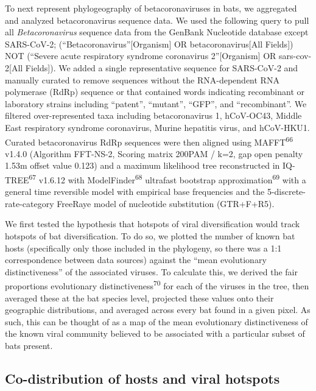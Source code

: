 \documentclass[11pt]{article}
\begin{document}
To next represent phylogeography of betacoronaviruses in bats, we
aggregated and analyzed betacoronavirus sequence data. We used the
following query to pull all \emph{Betacoronavirus} sequence data from
the GenBank Nucleotide database except SARS-CoV-2;
(``Betacoronavirus''{[}Organism{]} OR betacoronavirus{[}All Fields{]})
NOT (``Severe acute respiratory syndrome coronavirus 2''{[}Organism{]}
OR sars-cov-2{[}All Fields{]}). We added a single representative
sequence for SARS-CoV-2 and manually curated to remove sequences without
the RNA-dependent RNA polymerase (RdRp) sequence or that contained words
indicating recombinant or laboratory strains including ``patent'',
``mutant'', ``GFP'', and ``recombinant''. We filtered over-represented
taxa including betacoronavirus 1, hCoV-OC43, Middle East respiratory
syndrome coronavirus, Murine hepatitis virus, and hCoV-HKU1. Curated
betacoronavirus RdRp sequences were then aligned using
MAFFT\textsuperscript{66} v1.4.0 (Algorithm FFT-NS-2, Scoring matrix
200PAM / k=2, gap open penalty 1.53m offset value 0.123) and a maximum
likelihood tree reconstructed in IQ-TREE\textsuperscript{67} v1.6.12
with ModelFinder\textsuperscript{68} ultrafast bootstrap
approximation\textsuperscript{69} with a general time reversible model
with empirical base frequencies and the 5-discrete-rate-category
FreeRaye model of nucleotide substitution (GTR+F+R5).

We first tested the hypothesis that hotspots of viral diversification
would track hotspots of bat diversification. To do so, we plotted the
number of known bat hosts (specifically only those included in the
phylogeny, so there was a 1:1 correspondence between data sources)
against the ``mean evolutionary distinctiveness'' of the associated
viruses. To calculate this, we derived the fair proportions evolutionary
distinctiveness\textsuperscript{70} for each of the viruses in the tree,
then averaged these at the bat species level, projected these values
onto their geographic distributions, and averaged across every bat found
in a given pixel. As such, this can be thought of as a map of the mean
evolutionary distinctiveness of the known viral community believed to be
associated with a particular subset of bats present.

\hypertarget{co-distribution-of-hosts-and-viral-hotspots}{%
\subsection{Co-distribution of hosts and viral
hotspots}\label{co-distribution-of-hosts-and-viral-hotspots}}
\end{document}
